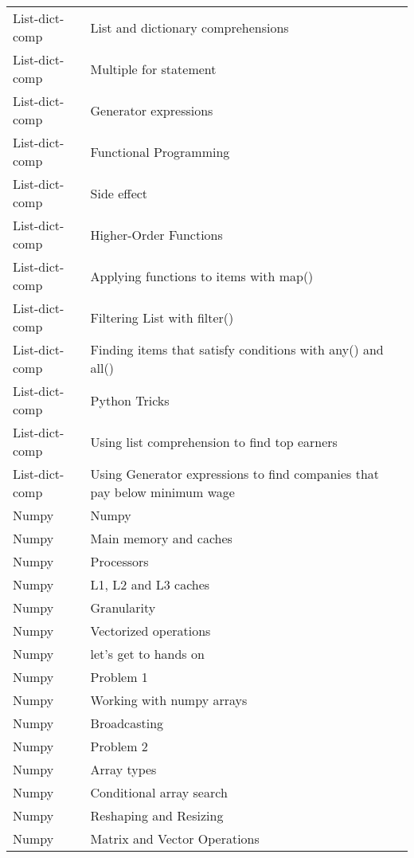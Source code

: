 \documentclass[10pt,a4paper]{article}
\begin{document}
\begin{landscape}
\begin{longtable}{|l|l|l|}
List-dict-comp & List and dictionary comprehensions & \cite{ceder2018quick} \\
    List-dict-comp & Multiple for statement & \cite{danjou2018serious} \\
    List-dict-comp & Generator expressions & \cite{ceder2018quick} \\
    List-dict-comp & Functional Programming & \cite{sweigart2020beyond} \\
    List-dict-comp & Side effect & \cite{sweigart2020beyond} \\
    List-dict-comp & Higher-Order Functions & \cite{sweigart2020beyond} \\
    List-dict-comp & Applying functions to items with map() & \cite{danjou2018serious} \\
    List-dict-comp & Filtering List with filter() & \cite{danjou2018serious} \\
    List-dict-comp & Finding items that satisfy conditions with any() and all() & \cite{danjou2018serious} \\
    List-dict-comp & Python Tricks & \cite{mayer2020oneliners} \\
    List-dict-comp & Using list comprehension to find top earners & \cite{mayer2020oneliners} \\
    List-dict-comp & Using Generator expressions to find companies that pay below minimum wage & \cite{mayer2020oneliners} \\
    
Numpy & Numpy & \cite{mayer2020oneliners} \\
    Numpy & Main memory and caches & \cite{herlihy20211} \\
    Numpy & Processors & \cite{herlihy20211} \\
    Numpy & L1, L2 and L3 caches & \cite{robey2021parallel} \\
    Numpy & Granularity & \cite{herlihy20211} \\
    Numpy & Vectorized operations & \cite{robey2021parallel} \\
    Numpy & let's get to hands on & \cite{mayer2020oneliners} \\
    Numpy & Problem 1 & \cite{mayer2020oneliners} \\
    Numpy & Working with numpy arrays & \cite{mayer2020oneliners} \\
    Numpy & Broadcasting & \cite{mayer2020oneliners} \\
    Numpy & Problem 2 & \cite{mayer2020oneliners} \\
    Numpy & Array types & \cite{mayer2020oneliners} \\
    Numpy & Conditional array search & \cite{mayer2020oneliners} \\
    Numpy & Reshaping and Resizing & \cite{johansson10numerical} \\
    Numpy & Matrix and Vector Operations & \cite{johansson10numerical} \\
    

\end{longtable}
\end{landscape}
\end{document}
